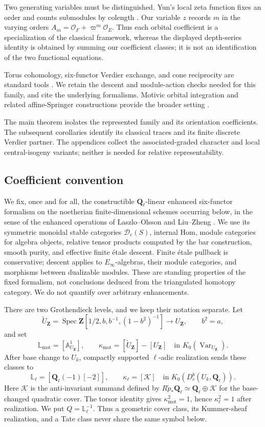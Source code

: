 \documentclass[11pt]{article}
\theoremstyle{definition}
\theoremstyle{remark}
\newcommand{\Qell}{\mathbf Q_\ell}
\newcommand{\Lmot}{\mathbb L_{\mathrm{mot}}}
\newcommand{\Lell}{\mathbb L_{\ell}}
\newcommand{\UZ}{U_{\mathbf Z}}
\newcommand{\Uk}{U_k}
\newcommand{\kappamot}{\kappa_{\mathrm{mot}}}
\newcommand{\kappaell}{\kappa_{\ell}}
\newcommand{\cK}{\mathcal K}
\newcommand{\Spec}{\operatorname{Spec}}
\begin{document}
Two generating variables must be distinguished.  Yun's local zeta
function fixes an order and counts submodules by colength
\cite[\S2.3 and Theorem~2.5]{YunOrbitalOrders}.  Our variable $z$ records
$m$ in the varying orders $A_m=\mathcal O_F+\varpi^m\mathcal O_E$.
Thus each orbital coefficient is a specialization of the classical
framework, whereas the displayed depth-series identity is obtained by
summing our coefficient classes; it is not an identification of the two
functional equations.

Torus cohomology, six-functor Verdier exchange, and cone reciprocity are
standard tools \cite{LaszloOlsson,LiuZhengEnhanced,Stanley,Curry,BresslerLunts}.
We retain the descent and module-action checks needed for this family,
and cite the underlying formalisms.  Motivic orbital integration and
related affine-Springer constructions provide the broader setting
\cite{HalesMotivic,CluckersHalesLoeser,GKM,ChenFundamentalDomain,
ChenWeighted,ChenLocalBehavior,CunninghamHalesGood}.

The main theorem isolates the represented family and its orientation
coefficients.  The subsequent corollaries identify its classical traces
and its finite discrete Verdier partner.  The appendices collect the
associated-graded character and local central-isogeny variants; neither
is needed for relative representability.

\subsection{Coefficient convention}

We fix, once and for all, the constructible $\Qell$-linear enhanced
six-functor formalism on the noetherian finite-dimensional schemes occurring
below, in the sense of the enhanced operations of
Laszlo--Olsson and Liu--Zheng \cite{LaszloOlsson,LiuZhengEnhanced}.
We use its symmetric monoidal stable categories $\mathscr D_c(S)$, internal
Hom, module categories for algebra objects, relative tensor products computed
by the bar construction, smooth purity, and effective finite \'etale descent.
Finite \'etale pullback is conservative; descent applies to $E_\infty$-algebras,
their module categories, and morphisms between dualizable modules.  These are
standing properties of the fixed formalism, not conclusions deduced from the
triangulated homotopy category.  We do not quantify over arbitrary
enhancements.

There are two Grothendieck levels, and we keep their notation separate.  Let
\[
 \widetilde\UZ=\Spec\mathbf Z[1/2,b,b^{-1},(1-b^2)^{-1}]
 \longrightarrow\UZ,\qquad b^2=a,
\]
and set
\[
 \Lmot=[\mathbb A^1_{\UZ}],\qquad
 \kappamot=[\widetilde\UZ]-[\UZ]
 \quad\text{in }K_0(\operatorname{Var}_{\UZ}).
\]
After base change to $\Uk$, compactly supported $\ell$-adic realization sends
these classes to
\[
 \Lell=[\Qell(-1)[-2]],\qquad
 \kappaell=[\cK]
 \quad\text{in }K_0(D_c^b(\Uk,\Qell)).
\]
Here $\cK$ is the anti-invariant summand defined by
$R\widetilde p_*\Qell\simeq\Qell\oplus\cK$ for the base-changed quadratic
cover.  The torsor identity gives $\kappamot^2=1$, hence
$\kappaell^2=1$ after realization.
We put $Q=\Lell^{-1}$.  Thus a geometric cover class, its Kummer-sheaf
realization, and a Tate class never share the same symbol below.
\end{document}
